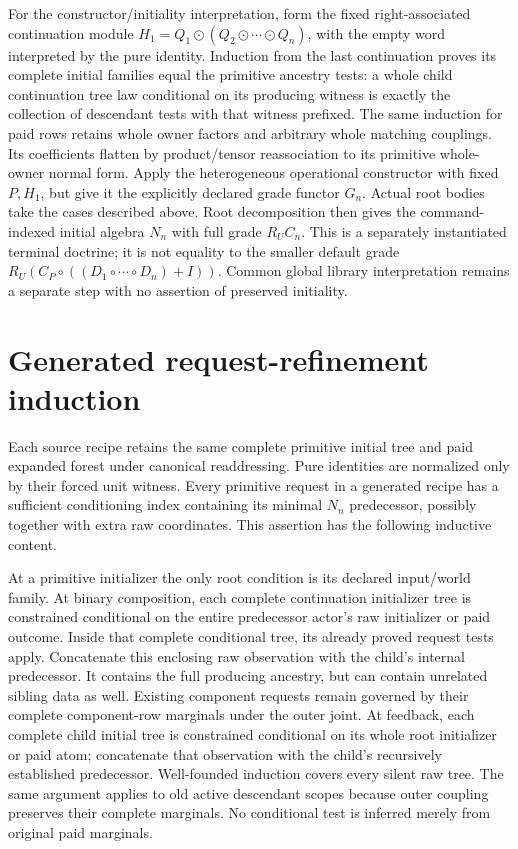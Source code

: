 \documentclass[11pt]{article}\usepackage{amsmath,amssymb,amsthm,geometry}\geometry{margin=1in}\newtheorem{definition}{Definition}\newtheorem{theorem}[definition]{Theorem}
\begin{document}
For the constructor/initiality interpretation, form the fixed right-associated continuation module $H_1=Q_1\odot(Q_2\odot\cdots\odot Q_n)$, with the empty word interpreted by the pure identity. Induction from the last continuation proves its complete initial families equal the primitive ancestry tests: a whole child continuation tree law conditional on its producing witness is exactly the collection of descendant tests with that witness prefixed. The same induction for paid rows retains whole owner factors and arbitrary whole matching couplings. Its coefficients flatten by product/tensor reassociation to its primitive whole-owner normal form. Apply the heterogeneous operational constructor with fixed $P,H_1$, but give it the explicitly declared grade functor $G_n$. Actual root bodies take the cases described above. Root decomposition then gives the command-indexed initial algebra $N_n$ with full grade $R_UC_n$. This is a separately instantiated terminal doctrine; it is not equality to the smaller default grade $R_U(C_P\circ((D_1\circ\cdots\circ D_n)+I))$. Common global library interpretation remains a separate step with no assertion of preserved initiality.

\section{Generated request-refinement induction}
Each source recipe retains the same complete primitive initial tree and paid expanded forest under canonical readdressing. Pure identities are normalized only by their forced unit witness. Every primitive request in a generated recipe has a sufficient conditioning index containing its minimal $N_n$ predecessor, possibly together with extra raw coordinates. This assertion has the following inductive content.

At a primitive initializer the only root condition is its declared input/world family. At binary composition, each complete continuation initializer tree is constrained conditional on the entire predecessor actor's raw initializer or paid outcome. Inside that complete conditional tree, its already proved request tests apply. Concatenate this enclosing raw observation with the child's internal predecessor. It contains the full producing ancestry, but can contain unrelated sibling data as well. Existing component requests remain governed by their complete component-row marginals under the outer joint. At feedback, each complete child initial tree is constrained conditional on its whole root initializer or paid atom; concatenate that observation with the child's recursively established predecessor. Well-founded induction covers every silent raw tree. The same argument applies to old active descendant scopes because outer coupling preserves their complete marginals. No conditional test is inferred merely from original paid marginals.
\end{document}
